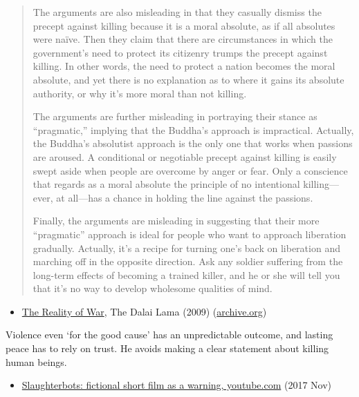 \begin{quote}
The arguments are also misleading in that they casually dismiss the
precept against killing because it is a moral absolute, as if all
absolutes were naïve. Then they claim that there are circumstances in
which the government's need to protect its citizenry trumps the precept
against killing. In other words, the need to protect a nation becomes
the moral absolute, and yet there is no explanation as to where it gains
its absolute authority, or why it's more moral than not killing.

The arguments are further misleading in portraying their stance as
``pragmatic,'' implying that the Buddha's approach is impractical.
Actually, the Buddha's absolutist approach is the only one that works
when passions are aroused. A conditional or negotiable precept against
killing is easily swept aside when people are overcome by anger or fear.
Only a conscience that regards as a moral absolute the principle of no
intentional killing---ever, at all---has a chance in holding the line
against the passions.

Finally, the arguments are misleading in suggesting that their more
``pragmatic'' approach is ideal for people who want to approach
liberation gradually. Actually, it's a recipe for turning one's back on
liberation and marching off in the opposite direction. Ask any soldier
suffering from the long-term effects of becoming a trained killer, and
he or she will tell you that it's no way to develop wholesome qualities
of mind.
\end{quote}

\begin{itemize}
\tightlist
\item
  \href{https://www.dalailama.com/messages/world-peace/the-reality-of-war}{The
  Reality of War}, The Dalai Lama (2009)
  (\href{https://web.archive.org/web/20210526055246/https://www.dalailama.com/messages/world-peace/the-reality-of-war}{archive.org})
\end{itemize}

Violence even `for the good cause' has an unpredictable outcome, and
lasting peace has to rely on trust. He avoids making a clear statement
about killing human beings.

\begin{itemize}
\tightlist
\item
  \href{https://www.youtube.com/watch?v=HipTO_7mUOw}{Slaughterbots:
  fictional short film as a warning, youtube.com} (2017 Nov)
\end{itemize}

